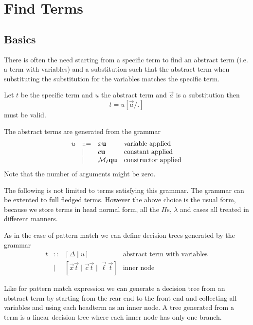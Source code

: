 \section{Find Terms}







\subsection{Basics}

There is often the need starting from a specific term to find an abstract term
(i.e. a term with variables) and a substitution such that the abstract term when
substituting the substitution for the variables matches the specific term.

Let $t$ be the specific term and $u$ the abstract term and $\vec a$ is a
substitution then
$$
    t = u[\vec a / .]
$$
must be valid.

The abstract terms are generated from the grammar
$$
\begin{array}{llll}
    u
    &::=& x {\mathbf u} & \text{variable applied}
    \\
    &\mid& c {\mathbf u} & \text{constant applied}
    \\
    &\mid& {\cal M}_\ell {\mathbf q} {\mathbf u} & \text{constructor applied}
\end{array}
$$
Note that the number of arguments might be zero.

The following is not limited to terms satisfying this grammar. The grammar can
be extented to full fledged terms. However the above choice is the usual form,
because we store terms in head normal form, all the $\Pi$s, $\lambda$ and cases
all treated in different manners.

As in the case of pattern match we can define decision trees generated by the
grammar
$$
\begin{array}{llll}
    t
    &::& [\Delta \mid u]
    &\text{abstract term with variables}
    \\
    &\mid& [\vec x \vec t \mid \vec c \vec t \mid \vec \ell \vec t]
    &\text{inner node}
\end{array}
$$

Like for pattern match expression we can generate a decision tree from an
abstract term by starting from the rear end to the front end and collecting all
variables and using each headterm as an inner node. A tree generated from a term
is a linear decision tree where each inner node has only one branch.

